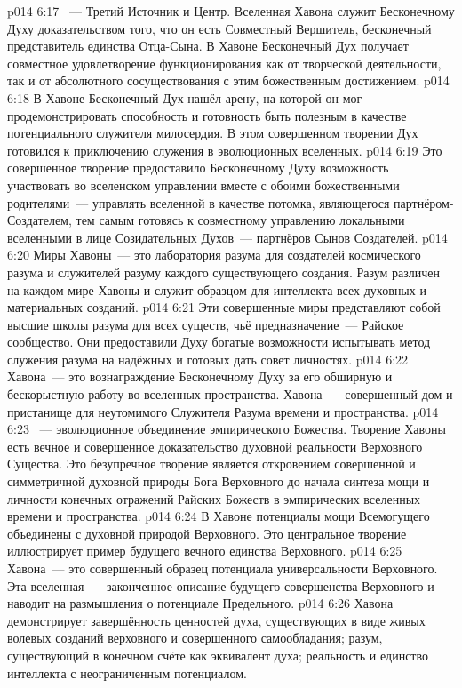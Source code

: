\vs p014 6:17 ~--- Третий Источник и Центр. Вселенная Хавона служит Бесконечному Духу доказательством того, что он есть Совместный Вершитель, бесконечный представитель единства Отца\hyp{}Сына. В Хавоне Бесконечный Дух получает совместное удовлетворение функционирования как от творческой деятельности, так и от абсолютного сосуществования с этим божественным достижением.
\vs p014 6:18 В Хавоне Бесконечный Дух нашёл арену, на которой он мог продемонстрировать способность и готовность быть полезным в качестве потенциального служителя милосердия. В этом совершенном творении Дух готовился к приключению служения в эволюционных вселенных.
\vs p014 6:19 Это совершенное творение предоставило Бесконечному Духу возможность участвовать во вселенском управлении вместе с обоими божественными родителями~--- управлять вселенной в качестве потомка, являющегося партнёром\hyp{}Создателем, тем самым готовясь к совместному управлению локальными вселенными в лице Созидательных Духов~--- партнёров Сынов Создателей.
\vs p014 6:20 Миры Хавоны~--- это лаборатория разума для создателей космического разума и служителей разуму каждого существующего создания. Разум различен на каждом мире Хавоны и служит образцом для интеллекта всех духовных и материальных созданий.
\vs p014 6:21 Эти совершенные миры представляют собой высшие школы разума для всех существ, чьё предназначение~--- Райское сообщество. Они предоставили Духу богатые возможности испытывать метод служения разума на надёжных и готовых дать совет личностях.
\vs p014 6:22 Хавона~--- это вознаграждение Бесконечному Духу за его обширную и бескорыстную работу во вселенных пространства. Хавона~--- совершенный дом и пристанище для неутомимого Служителя Разума времени и пространства.
\vs p014 6:23 ~--- эволюционное объединение эмпирического Божества. Творение Хавоны есть вечное и совершенное доказательство духовной реальности Верховного Существа. Это безупречное творение является откровением совершенной и симметричной духовной природы Бога Верховного до начала синтеза мощи и личности конечных отражений Райских Божеств в эмпирических вселенных времени и пространства.
\vs p014 6:24 В Хавоне потенциалы мощи Всемогущего объединены с духовной природой Верховного. Это центральное творение иллюстрирует пример будущего вечного единства Верховного.
\vs p014 6:25 Хавона~--- это совершенный образец потенциала универсальности Верховного. Эта вселенная~--- законченное описание будущего совершенства Верховного и наводит на размышления о потенциале Предельного.
\vs p014 6:26 Хавона демонстрирует завершённость ценностей духа, существующих в виде живых волевых созданий верховного и совершенного самообладания; разум, существующий в конечном счёте как эквивалент духа; реальность и единство интеллекта с неограниченным потенциалом.
